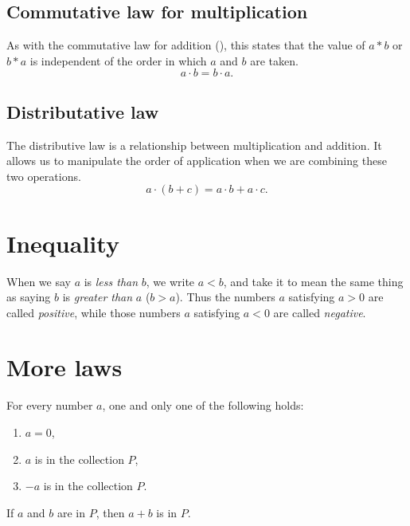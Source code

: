 \subsection{Commutative law for multiplication}
As with the commutative law for addition (),
this states that the value of $a * b$ or $b * a$ is independent of the order
in which $a$ and $b$ are taken.\cite[pg.~14]{pinter}
\begin{equation}
    a \cdot b = b \cdot a.
\end{equation}

\subsection{Distributative law}
The distributive law is a relationship between multiplication and addition.
It allows us to manipulate the order of application when we are combining these
two operations.
\begin{equation}
    a \cdot (b + c) = a \cdot b + a \cdot c.
\end{equation}

\section{Inequality}
When we say $a$ is 
\emph{less than}
$b$, we write $a < b$,
and take it to mean the same thing as saying $b$ is 
\emph{greater than}
$a$ ($b > a$).\cite[pg.~9]{spivak}
Thus the numbers $a$ satisfying $a > 0$ are called \emph{positive}, while
those numbers $a$ satisfying $a < 0$ are called \emph{negative}.

\section{More laws}
\begin{theorem}
For every number $a$, one and only one of the following holds:
\begin{enumerate}
    \item $a = 0$,
    \item $a$ is in the collection $P$,
    \item $-a$ is in the collection $P$.
\end{enumerate}
\cite[pg.~9]{spivak}
\end{theorem}

\begin{theorem}
If $a$ and $b$ are in $P$, then $a + b$ is in $P$.
\cite[pg.~9]{spivak}
\end{theorem}

